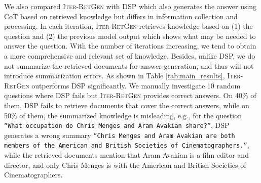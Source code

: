\documentclass[11pt]{article}
\begin{document}
We also compared I\textsc{ter}-R\textsc{et}G\textsc{en} with DSP which also generates the answer using CoT based on retrieved knowledge but differs in information collection and processing.
In each iteration, I\textsc{ter}-R\textsc{et}G\textsc{en} retrieves knowledge based on (1) the question and (2) the previous model output which shows what may be needed to answer the question.
With the number of iterations increasing, we tend to obtain a more comprehensive and relevant set of knowledge.
Besides, unlike DSP, we do not summarize the retrieved documents for answer generation, and thus will not introduce summarization errors.
As shown in Table \ref{tab:main_results}, I\textsc{ter}-R\textsc{et}G\textsc{en} outperforms DSP significantly.
We manually investigate 10 random questions where DSP fails but I\textsc{ter}-R\textsc{et}G\textsc{en} provides correct answers.
On 40\% of them, DSP fails to retrieve documents that cover the correct answers, while on 50\% of them, the summarized knowledge is misleading, e.g., for the question \texttt{``What occupation do Chris Menges and Aram Avakian share?''}, DSP generates a wrong summary \texttt{``Chris Menges and Aram Avakian are both members of the American and British Societies of Cinematographers.''}, while the retrieved documents mention that Aram Avakian is a film editor and director, and only Chris Menges is with the American and British Societies of Cinematographers.

\begingroup
\setlength{\tabcolsep}{3pt} %
\renewcommand{\arraystretch}{1} %
\begin{table}[t!]
    \centering
    \caption{
    Effect of using LLM generation $y_1$ on optimizing a dense retriever.
    We evaluated I\textsc{ter}-R\textsc{et}G\textsc{en} on HotPotQA and Feverous in terms of \texttt{Acc\textsuperscript{\dag}}.
    }
    \label{tab:retriever_adapt}
\end{table}
\endgroup
\end{document}
